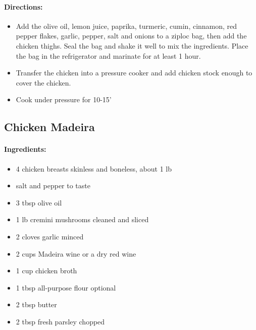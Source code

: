\documentclass{article}
\begin{document}
\paragraph{Directions:}
\begin{itemize}
	\item Add the olive oil, lemon juice, paprika, turmeric, cumin, cinnamon, red pepper flakes, garlic, pepper, salt and onions to a ziploc bag, then add the chicken thighs. Seal the bag and shake it well to mix the ingredients. Place the bag in the refrigerator and marinate for at least 1 hour.
	\item Transfer the chicken into a pressure cooker and add chicken stock enough to cover the chicken.
	\item Cook under pressure for 10-15'
\end{itemize}

\subsection{Chicken Madeira}

\paragraph{Ingredients:}
\begin{itemize}
	\item 4 chicken breasts skinless and boneless, about 1 lb
	\item salt and pepper to taste
	\item 3 tbsp olive oil
	\item 1 lb cremini mushrooms cleaned and sliced
	\item 2 cloves garlic minced
	\item 2 cups Madeira wine or a dry red wine
	\item 1 cup chicken broth
	\item 1 tbsp all-purpose flour optional
	\item 2 tbsp butter
	\item 2 tbsp fresh parsley chopped
\end{itemize}
\end{document}
